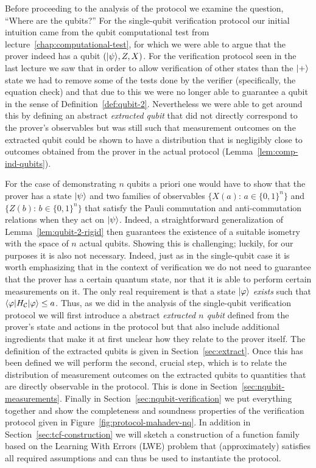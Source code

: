Before proceeding to the analysis of the protocol we examine the question, ``Where are the qubits?'' For the single-qubit verification protocol our initial intuition came from the qubit computational test from lecture~\ref{chap:computational-test}, for which we were able to argue that the prover indeed has a qubit $(|\psi\rangle,Z,X)$. For the verification protocol seen in the last lecture we saw that in order to allow verification of other states than the $|+\rangle$ state we had to remove some of the tests done by the verifier (specifically, the equation check) and that due to this we were no longer able to guarantee a qubit in the sense of Definition~\ref{def:qubit-2}. Nevertheless we were able to get around this by defining an abstract \emph{extracted qubit} that did not directly correspond to the prover's observables but was still such that measurement outcomes on the extracted qubit could be shown to have a distribution that is negligibly close to outcomes obtained from the prover in the actual protocol (Lemma~\ref{lem:comp-ind-qubits}). 

For the case of demonstrating $n$ qubits a priori one would have to show that the prover has a state $|\psi\rangle$ and two families of observables $\{X(a):\, a\in\{0,1\}^n\}$ and $\{Z(b):\,b\in\{0,1\}^n\}$ that satisfy the Pauli commutation and anti-commutation relations when they act on $|\psi\rangle$. Indeed, a straightforward generalization of Lemma~\ref{lem:qubit-2-rigid} then guarantees the existence of a suitable isometry with the space of $n$ actual qubits. 
Showing this is challenging; luckily, for our purposes it is also not necessary. Indeed, just as in the single-qubit case it is worth emphasizing that in the context of verification we do not need to guarantee that the prover has a certain quantum state, nor that it is able to perform certain measurements on it. The only real requirement is that a state $|\varphi\rangle$ \emph{exists} such that $\langle\varphi| H_{\mathcal{C}} |\varphi\rangle \leq a$. Thus, as we did in the analysis of the single-qubit verification protocol we will first introduce a abstract \emph{extracted $n$ qubit} defined from the prover's state and actions in the protocol but that also include additional ingredients that make it at first unclear how they relate to the prover itself. The definition of the extracted qubits is given in Section~\ref{sec:extract}. Once this has been defined we will perform the second, crucial step, which is to relate the distribution of measurement outcomes on the extracted qubits to quantities that are directly observable in the protocol. This is done in Section~\ref{sec:nqubit-measurements}. Finally in Section~\ref{sec:nqubit-verification} we put everything together and show the completeness and soundness properties of the verification protocol given in Figure~\ref{fig:protocol-mahadev-nq}. In addition in Section~\ref{sec:tcf-construction} we will sketch a construction of a function family based on the Learning With Errors (LWE) problem that (approximately) satisfies all required assumptions  and can thus be used to instantiate the protocol. 


